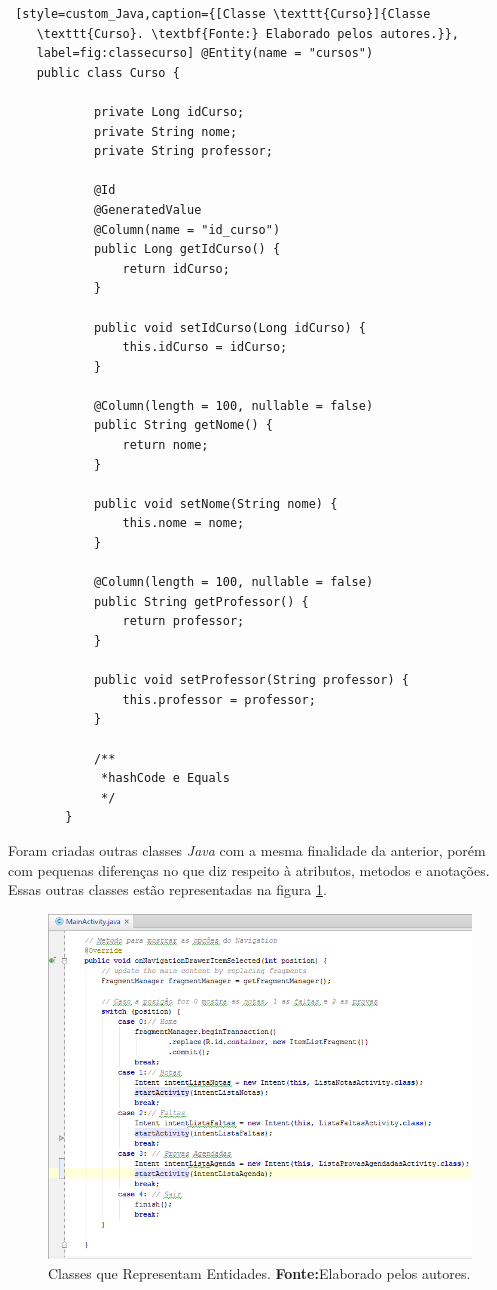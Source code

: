 	\pagebreak
	
	\begin{lstlisting} [style=custom_Java,caption={[Classe \texttt{Curso}]{Classe
	\texttt{Curso}. \textbf{Fonte:} Elaborado pelos autores.}},
	label=fig:classecurso] @Entity(name = "cursos") 
	public class Curso {

			private Long idCurso;
			private String nome;
			private String professor;
		
			@Id
			@GeneratedValue
			@Column(name = "id_curso")
			public Long getIdCurso() {
				return idCurso;
			}
		
			public void setIdCurso(Long idCurso) {
				this.idCurso = idCurso;
			}
		
			@Column(length = 100, nullable = false)
			public String getNome() {
				return nome;
			}
		
			public void setNome(String nome) {
				this.nome = nome;
			}
		
			@Column(length = 100, nullable = false)
			public String getProfessor() {
				return professor;
			}
		
			public void setProfessor(String professor) {
				this.professor = professor;
			}
			
			/**
			 *hashCode e Equals
			 */
		}
	\end{lstlisting}
	
		\par Foram criadas outras classes \textit{Java} com a mesma finalidade da
	anterior, porém com pequenas diferenças no que diz respeito à atributos,
	metodos e anotações. Essas outras classes estão representadas na
	figura \ref{fig:otherclass}.
	
		\begin{figure}[h!]
			\centerline{\includegraphics[scale=0.5]{./imagens/imagem6.png}}
			\caption[Classes que Representam Entidades]{Classes que Representam Entidades.
			\textbf{Fonte:}Elaborado pelos autores.}
			\label{fig:otherclass}
		\end{figure}
		
